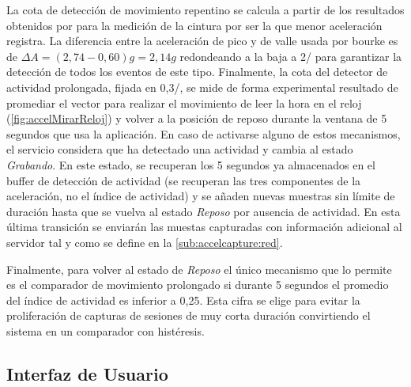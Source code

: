 La cota de detección de movimiento repentino se calcula a partir de los resultados obtenidos por  para la medición de la cintura por ser la que menor aceleración registra. La diferencia entre la aceleración de pico y de valle usada por bourke es de $\Delta A = (2,74 - 0,60)g = 2,14g$ redondeando a la baja a 2\g/ para garantizar la detección de todos los eventos de este tipo. Finalmente, la cota del detector de actividad prolongada, fijada en 0,3/, se mide de forma experimental resultado de promediar el vector para realizar el movimiento de leer la hora en el reloj (\autoref{fig:accelMirarReloj}) y volver a la posición de reposo durante la ventana de 5 segundos que usa la aplicación. En caso de activarse alguno de estos mecanismos, el servicio considera que ha detectado una actividad y cambia al estado \textit{Grabando}. En este estado, se recuperan los 5 segundos ya almacenados en el buffer de detección de actividad (se recuperan las tres componentes de la aceleración, no el índice de actividad) y se añaden nuevas muestras sin límite de duración hasta que se vuelva al estado \textit{Reposo} por ausencia de actividad. En esta última transición se enviarán las muestas capturadas con información adicional al servidor tal y como se define en la \autoref{sub:accelcapture:red}.

Finalmente, para volver al estado de \textit{Reposo} el único mecanismo que lo permite es el comparador de movimiento prolongado si durante 5 segundos el promedio del índice de actividad es inferior a 0,25. Esta cifra se elige para evitar la proliferación de capturas de sesiones de muy corta duración convirtiendo el sistema en un comparador con histéresis.


\subsection{Interfaz de Usuario}\label{sub:accelcapture:interfaz}

